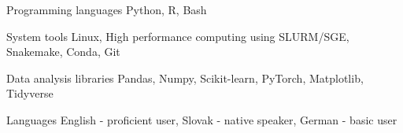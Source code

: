 

\begin{cvskills}

  \cvskill
    {Programming languages} %
    {
    Python, 
    R,
    Bash
    } %

  \cvskill
    {System tools} %
    {Linux, High performance computing using SLURM/SGE, Snakemake, Conda, Git} %

  \cvskill
    {Data analysis libraries} %
    {Pandas, Numpy, Scikit-learn, PyTorch, Matplotlib, Tidyverse} %

  \cvskill
    {Languages} %
    {English - proficient user, Slovak - native speaker, German - basic user} %

\end{cvskills}